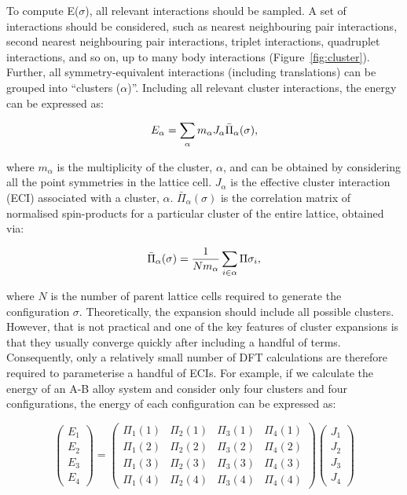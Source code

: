 \documentclass[../main.tex]{subfiles}
\begin{document}
To compute E($\sigma$), all relevant interactions should be sampled. A set of interactions should be considered, such as nearest neighbouring pair interactions, second nearest neighbouring pair interactions, triplet interactions, quadruplet interactions, and so on, up to many body interactions (Figure~\ref{fig:cluster}). Further, all symmetry-equivalent interactions (including translations) can be grouped into ``clusters ($\alpha$)''. Including all relevant cluster interactions, the energy can be expressed as:

\begin{equation}
    \centering
    {E}_{\alpha}=\sum_\alpha {m_\alpha}{J_\alpha}{\bar{\Pi}_\alpha(\sigma)},
    \label{eq:clusters}
\end{equation} 

where $m_\alpha$ is the multiplicity of the cluster, $\alpha$, and can be obtained by considering all the point symmetries in the lattice cell. $J_\alpha$ is the effective cluster interaction (ECI) associated with a cluster, $\alpha$. $\bar{\Pi}_\alpha(\sigma)$ is the correlation matrix of normalised spin-products for a particular cluster of the entire lattice, obtained via:

\begin{equation}
    \centering
    {\bar{\Pi}_\alpha(\sigma)}=\frac{1}{N{m_\alpha}}\sum_{i\in\alpha} {\Pi{\sigma_i}},
    \label{eq:correlation_matrix}
\end{equation} 

where $N$ is the number of parent lattice cells required to generate the configuration $\sigma$. Theoretically, the expansion should include all possible clusters. However, that is not practical and one of the key features of cluster expansions is that they usually converge quickly after including a handful of terms.\cite{VanderVen2001} Consequently, only a relatively small number of DFT calculations are therefore required to parameterise a handful of ECIs. For example, if we calculate the energy of an A-B alloy system and consider only four clusters and four configurations, the energy of each configuration can be expressed as:

\begin{equation}
{\left( \begin{array}{cccc}
{E_1}\\
{E_2}\\
{E_3}\\
{E_4}
\end{array}\right)}=
{\left( \begin{array}{cccc}
{\Pi_1}(1) & {\Pi_2}(1) & {\Pi_3}(1) & {\Pi_4}(1) \\
{\Pi_1}(2) & {\Pi_2}(2) & {\Pi_3}(2) & {\Pi_4}(2)  \\
{\Pi_1}(3) & {\Pi_2}(3) & {\Pi_3}(3) & {\Pi_4}(3)  \\
{\Pi_1}(4) & {\Pi_2}(4) & {\Pi_3}(4) & {\Pi_4}(4) 
\end{array}\right)}
{\left(\begin{array}{cccc}
{J_1}\\
{J_2}\\
{J_3}\\
{J_4}
\end{array}\right)}
\end{equation}
\end{document}

